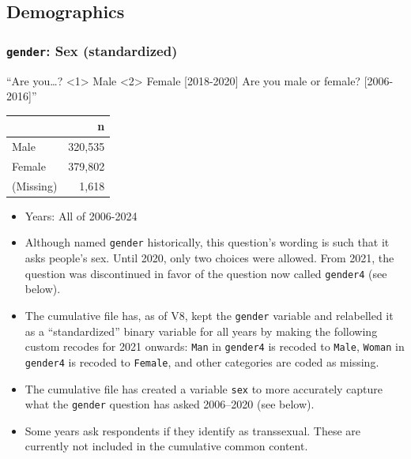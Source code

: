 \documentclass[10pt,article,oneside]{memoir}
\begin{document}
\subsection{Demographics}\label{demographics}

\subsubsection{\texorpdfstring{\texttt{gender}: Sex
(standardized)}{gender: Sex (standardized)}}\label{gender-sex-standardized}

``Are you\ldots? \textless1\textgreater{} Male \textless2\textgreater{}
Female {[}2018-2020{]} Are you male or female? {[}2006-2016{]}''

\begin{table}[H]
\centering
\begin{tabular}[t]{lr}
\toprule
 & n\\
\midrule
Male & 320,535\\
Female & 379,802\\
(Missing) & 1,618\\
\bottomrule
\end{tabular}
\end{table}

\begin{itemize}
\tightlist
\item
  Years: All of 2006-2024
\item
  Although named \texttt{gender} historically, this question's wording
  is such that it asks people's sex. Until 2020, only two choices were
  allowed. From 2021, the question was discontinued in favor of the
  question now called \texttt{gender4} (see below).
\item
  The cumulative file has, as of V8, kept the \texttt{gender} variable
  and relabelled it as a ``standardized'' binary variable for all years
  by making the following custom recodes for 2021 onwards: \texttt{Man}
  in \texttt{gender4} is recoded to \texttt{Male}, \texttt{Woman} in
  \texttt{gender4} is recoded to \texttt{Female}, and other categories
  are coded as missing.
\item
  The cumulative file has created a variable \texttt{sex} to more
  accurately capture what the \texttt{gender} question has asked
  2006--2020 (see below).
\item
  Some years ask respondents if they identify as transsexual. These are
  currently not included in the cumulative common content.
\end{itemize}
\end{document}

